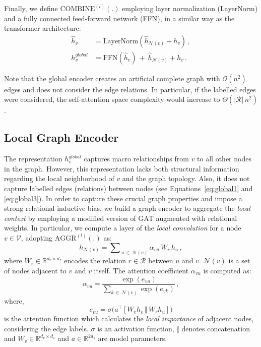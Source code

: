 \documentclass[11pt,a4paper]{article}
\begin{document}
Finally, we define $\textrm{COMBINE}^{(l)}(.)$ employing layer normalization (LayerNorm) and a fully connected feed-forward network (FFN), in a similar way as the transformer architecture:
\begin{align}
  \hat{h}_{v} &= \text{LayerNorm}(\hat{h}_{\mathcal{N}(v)} + h_{v}) \, , \label{eq:2}\\
h^{global}_{v} &= \text{FFN}(\hat{h}_{v}) \, + \, \hat{h}_{\mathcal{N}(v)} + h_{v} \, \label{eq:2b}.
\end{align}






Note that the global encoder creates an artificial complete graph with $\mathcal{O}(n^2)$ edges and does not consider the edge relations. In particular, if the labelled edges were considered, the self-attention space complexity would increase to $ \Theta( |\mathcal{R}| \,  n^2)$.



\subsection{Local Graph Encoder} 
\label{sec:localgraphenc}
The representation $h^{global}_{v}$ captures macro relationships from $v$ to all other nodes in the graph. However, this representation lacks both structural information regarding the local neighborhood of $v$ and the graph topology. Also, it does not capture labelled edges (relations) between nodes (see Equations~\ref{eq:global1} and \ref{eq:global3}). 
In order to capture these crucial graph properties and impose a strong relational inductive bias, we build a graph encoder to aggregate the \emph{local context} by employing a modified version of GAT augmented with relational weights. In particular, we compute a layer of the \textit{local convolution} for a node $v \in \mathcal{V}$, adopting $\textrm{AGGR}^{(l)}(.)$ as:
\begin{equation}
        h_{\mathcal{N}(v)} =
        \sum\nolimits_{\, u \, \in \, \mathcal{N}(v)} \alpha_{vu} \, W_r \, h_u \, ,
\label{eq:3}
\end{equation}
where $W_{r} \in \mathbb{R}^{d_v \times d_z}$ encodes the relation $r \in \mathcal{R}$ between $u$ and $v$. $\mathcal{N}(v)$ is a set of nodes adjacent to $v$ and $v$ itself. The attention coefficient $\alpha_{vu}$ is computed as:
\begin{equation}
\alpha_{vu} = \frac{\exp(e_{vu})}{ \sum_{k \, \in \, \mathcal{N}(v)} \exp(e_{vk})} \, ,
\label{eq:4}
\end{equation}
\noindent where, 
\begin{equation}
e_{vu} = \sigma \big( a^{\top}
        [ W_v h_v \, \Vert \, W_r h_u]
        \big)
\label{eq:5}
\end{equation}
is the attention function which calculates the \emph{local importance} of adjacent nodes, considering the edge labels. $\sigma$ is an activation function, $\Vert$ denotes concatenation and $W_{v} \in \mathbb{R}^{d_v \times d_z}$ and $a \in \mathbb{R}^{2d_z}$ are model parameters. 
\end{document}
